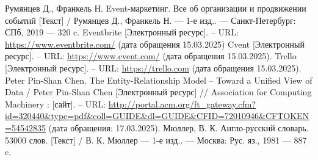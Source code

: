\begin{thebibliography}{}
	 Румянцев Д., Франкель Н. Event-маркетинг. Все об организации и продвижении событий [Текст] / Румянцев Д., Франкель Н. — 1-е изд.. — Санкт-Петербург: СПб, 2019 — 320 c.
	 Eventbrite [Электронный ресурс]. -- URL:  \url{https://www.eventbrite.com/} (дата обращения 15.03.2025)
	 Cvent [Электронный ресурс]. -- URL: \url{https://www.cvent.com/} (дата обращения 15.03.2025).
	 Trello [Электронный ресурс]. -- URL: \url{https://trello.com} (дата обращения 15.03.2025).
	 Peter Pin-Shan Chen. The Entity-Relationship Model -- Toward a Unified View of Data / Peter Pin-Shan Chen [Электронный ресурс] // Association for Computing Machinery : [сайт]. -- URL: \url{http://portal.acm.org/ft_gateway.cfm?id=320440&type=pdf&coll=GUIDE&dl=GUIDE&CFID=72010946&CFTOKEN=54542835} (дата обращения: 17.03.2025).
	 Мюллер, В. К. Англо-русский словарь. 53000 слов. [Текст] / В. К. Мюллер — 1-е изд.. — Москва: Рус. яз., 1981 — 887 c.
\end{thebibliography}
